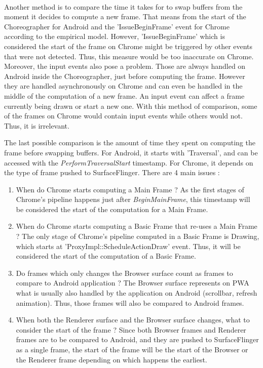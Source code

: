 \documentclass{kththesis}
\begin{document}
\paragraph{}
Another method is to compare the time it takes for to swap buffers from the moment it decides to compute a new frame. That means from the start of the Choreographer for Android and the 'IssueBeginFrame' event for Chrome according to the empirical model. However, 'IssueBeginFrame' which is considered the start of the frame on Chrome might be triggered by other events that were not detected. Thus, this measure would be too inaccurate on Chrome. \newline
Moreover, the input events also pose a problem. Those are always handled on Android inside the Choreographer, just before computing the frame. However they are handled asynchronously on Chrome and can even be handled in the middle of the computation of a new frame. An input event can affect a frame currently being drawn or start a new one. With this method of comparison, some of the frames on Chrome would contain input events while others would not. Thus, it is irrelevant. 

The last possible comparison is the amount of time they spent on computing the frame before swapping buffers. For Android, it starts with 'Traversal', and can be accessed with the \textit{PerformTraversalStart} timestamp. For Chrome, it depends on the type of frame pushed to SurfaceFlinger. There are 4 main issues :
\begin{enumerate}
    \item When do Chrome starts computing a Main Frame ? \newline
    As the first stages of Chrome's pipeline happens just after \textit{BeginMainFrame}, this timestamp will be considered the start of the computation for a Main Frame.
    \item When do Chrome starts computing a Basic Frame that re-uses a Main Frame ? \newline
    The only stage of Chrome's pipeline computed in a Basic Frame is Drawing, which starts at 'ProxyImpl::ScheduleActionDraw' event. Thus, it will be considered the start of the computation of a Basic Frame.
    \item Do frames which only changes the Browser surface count as frames to compare to Android application ? \newline
    The Browser surface represents on PWA what is usually also handled by the application on Android (scrollbar, refresh animation). Thus, those frames will also be compared to Android frames. 
    \item When both the Renderer surface and the Browser surface changes, what to consider the start of the frame ? \newline
    Since both Browser frames and Renderer frames are to be compared to Android, and they are pushed to SurfaceFlinger as a single frame, the start of the frame will be the start of the Browser or the Renderer frame depending on which happens the earliest. 
\end{enumerate}
\end{document}
